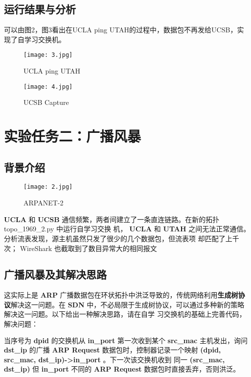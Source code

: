 \documentclass{xjtureport}
\begin{document}
\subsection{运行结果与分析}
可以由图2，图3看出在UCLA ping UTAH的过程中，数据包不再发给UCSB，实现了自学习交换机。
\begin{figure}[H]
	\centering
	\texttt{[image: 3.jpg]}
	\caption{UCLA  ping  UTAH}
\end{figure}
\begin{figure}[H]
	\centering
	\texttt{[image: 4.jpg]}
	\caption{UCSB Capture}
\end{figure}
\section{实验任务二：广播风暴}
\subsection{背景介绍}
\begin{figure}[H]
	\centering
	\texttt{[image: 2.jpg]}
	\caption{ARPANET-2}
\end{figure}
\textbf{UCLA} 和 \textbf{UCSB} 通信频繁，两者间建立了一条直连链路。在新的拓扑 topo\_1969\_2.py 中运行自学习交换
机， \textbf{UCLA} 和 \textbf{UTAH} 之间无法正常通信。分析流表发现，源主机虽然只发了很少的几个数据包，但流表项
却匹配了上千次； WireShark 也截取到了数目异常大的相同报文\par 
\subsection{广播风暴及其解决思路}
这实际上是\textbf{ ARP }广播数据包在环状拓扑中洪泛导致的，传统网络利用\textbf{生成树协议}解决这一问题。在 \textbf{SDN}
中，不必局限于生成树协议，可以通过多种新的策略解决这一问题。以下给出一种解决思路，请在自学
习交换机的基础上完善代码，解决问题：\par
当序号为 \textbf{dpid} 的交换机从 \textbf{in\_port} 第一次收到某个 \textbf{src\_mac} 主机发出，询问 \textbf{dst\_ip} 的广播 \textbf{ARP Request} 数据包时，控制器记录一个映射 \textbf{(dpid, src\_mac, dst\_ip)->in\_port} 。下一次该交换机收到
同一 \textbf{(src\_mac, dst\_ip)} 但 \textbf{in\_port} 不同的 \textbf{ARP Request} 数据包时直接丢弃，否则洪泛。 
\end{document}

